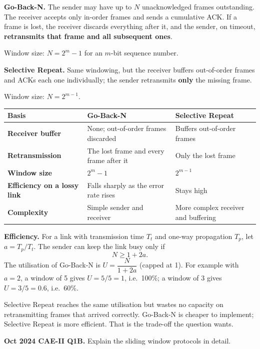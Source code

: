 \documentclass[11pt,a4paper]{article}
\begin{document}
\begin{solbox}
\textbf{Go-Back-N.} The sender may have up to $N$ unacknowledged frames outstanding. The receiver accepts only in-order frames and sends a cumulative ACK. If a frame is lost, the receiver discards everything after it, and the sender, on timeout, \textbf{retransmits that frame and all subsequent ones}.

Window size: $N = 2^m - 1$ for an $m$-bit sequence number.

\textbf{Selective Repeat.} Same windowing, but the receiver buffers out-of-order frames and ACKs each one individually; the sender retransmits \textbf{only} the missing frame.

Window size: $N = 2^{m-1}$.

\begin{center}\small
\begin{tabularx}{\textwidth}{>{\bfseries}p{} X X}
\toprule Basis & Go-Back-N & Selective Repeat\\
\midrule
Receiver buffer & None; out-of-order frames discarded & Buffers out-of-order frames\\
Retransmission & The lost frame and every frame after it & Only the lost frame\\
Window size & $2^m - 1$ & $2^{m-1}$\\
Efficiency on a lossy link & Falls sharply as the error rate rises & Stays high\\
Complexity & Simple sender and receiver & More complex receiver and buffering\\
\bottomrule
\end{tabularx}
\end{center}

\textbf{Efficiency.} For a link with transmission time $T_t$ and one-way propagation $T_p$, let $a = T_p / T_t$. The sender can keep the link busy only if
\[
N \ge 1 + 2a.
\]
The utilisation of Go-Back-N is $U = \dfrac{N}{1+2a}$ (capped at 1). For example with $a = 2$, a window of 5 gives $U = 5/5 = 1$, i.e.\ 100\%; a window of 3 gives $U = 3/5 = 0.6$, i.e.\ 60\%.

Selective Repeat reaches the same utilisation but wastes no capacity on retransmitting frames that arrived correctly. Go-Back-N is cheaper to implement; Selective Repeat is more efficient. That is the trade-off the question wants.
\end{solbox}

\begin{pyqbox}
\textbf{Oct 2024 CAE-II Q1B.} Explain the sliding window protocols in detail.
\end{pyqbox}
\end{document}
